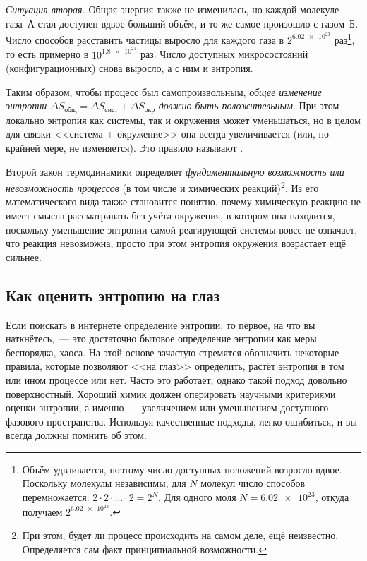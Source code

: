 \emph{Ситуация вторая.} Общая энергия также не изменилась, но каждой молекуле газа~А стал доступен вдвое больший объём, и то же самое произошло с газом~Б. Число способов расставить частицы выросло для каждого газа в $2^{\num{6,02e23}}$ раз\footnote{Объём удваивается, поэтому число доступных положений возросло вдвое. Поскольку молекулы независимы, для $N$ молекул число способов перемножается: $2 \cdot 2 \cdot \ldots \cdot 2 = 2^N$. Для одного моля $N = \num{6,02e23}$, откуда получаем $2^{\num{6,02e23}}$.}, то есть примерно в $10^{\num{1,8e23}}$ раз. Число доступных микросостояний (конфигурационных) снова выросло, а с ним и энтропия.

Таким образом, чтобы процесс был самопроизвольным, \emph{общее изменение энтропии} $\Delta S_{\text{общ}} = \Delta S_{\text{сист}} + \Delta S_{\text{окр}}$ \emph{должно быть положительным}. При этом локально энтропия как системы, так и окружения может уменьшаться, но в целом для связки <<система + окружение>> она всегда увеличивается (или, по крайней мере, не изменяется). Это правило называют .

Второй закон термодинамики определяет \emph{фундаментальную возможность или невозможность процессов} (в том числе и химических реакций)\footnote{При этом, будет ли процесс происходить на самом деле, ещё неизвестно. Определяется сам факт принципиальной возможности.}. Из его математического вида также становится понятно, почему химическую реакцию не имеет смысла рассматривать без учёта окружения, в котором она находится, поскольку уменьшение энтропии самой реагирующей системы вовсе не означает, что реакция невозможна, просто при этом энтропия окружения возрастает ещё сильнее.

\subsection*{Как оценить энтропию на глаз}

Если поискать в интернете определение энтропии, то первое, на что вы наткнётесь,~--- это достаточно бытовое определение энтропии как меры беспорядка, хаоса. На этой основе зачастую стремятся обозначить некоторые правила, которые позволяют <<на глаз>> определить, растёт энтропия в том или ином процессе или нет. Часто это работает, однако такой подход довольно поверхностный. Хороший химик должен оперировать научными критериями оценки энтропии, а именно~--- увеличением или уменьшением доступного фазового пространства. Используя качественные подходы, легко ошибиться, и вы всегда должны помнить об этом.

